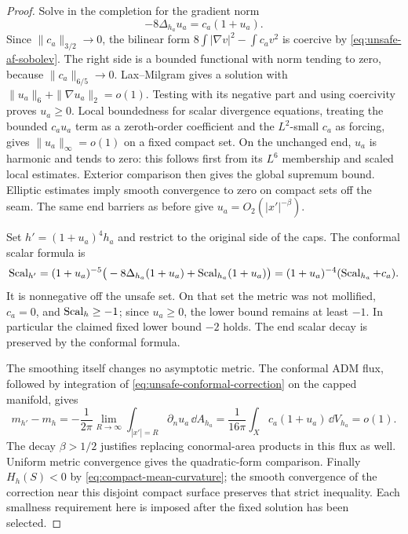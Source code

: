 \begin{proof}
Solve in the completion for the gradient norm
\begin{equation}
 -8\Delta_{h_a}u_a=c_a(1+u_a).
 \label{eq:unsafe-conformal-correction}
\end{equation}
Since \(\|c_a\|_{3/2}\to0\), the bilinear form
\(8\int|\nabla v|^2-\int c_av^2\) is coercive by
\eqref{eq:unsafe-af-sobolev}.  The right side is a bounded
functional with norm tending to zero, because
\(\|c_a\|_{6/5}\to0\).  Lax--Milgram gives a solution with
\(\|u_a\|_6+\|\nabla u_a\|_2=o(1)\).  Testing with its
negative part and using coercivity proves \(u_a\ge0\).
Local boundedness for scalar divergence equations, treating the
bounded \(c_a u_a\) term as a zeroth-order coefficient and the
\(L^2\)-small \(c_a\) as forcing, gives
\(\|u_a\|_\infty=o(1)\) on a fixed compact set.  On the
unchanged end, \(u_a\) is harmonic and tends to zero: this
follows first from its \(L^6\) membership and scaled local
estimates.  Exterior comparison then gives the global supremum
bound.  Elliptic estimates imply smooth convergence to zero on
compact sets off the seam.  The same end barriers as before give
\(u_a=O_2(|x'|^{-\beta})\).

Set \(h'=(1+u_a)^4h_a\) and restrict to the original side of
the caps.  The conformal scalar formula is
\begin{equation}
 \operatorname{Scal}_{h'}=(1+u_a)^{-5}
       \big(-8\Delta_{h_a}(1+u_a)+\operatorname{Scal}_{h_a}(1+u_a)\big)
       =(1+u_a)^{-4}(\operatorname{Scal}_{h_a}+c_a).
 \label{eq:unsafe-corrected-scalar}
\end{equation}
It is nonnegative off the unsafe set.  On that set the metric
was not mollified, \(c_a=0\), and \(\operatorname{Scal}_h\ge-1\);
since \(u_a\ge0\), the lower bound remains at least \(-1\).
In particular the claimed fixed lower bound \(-2\) holds.
The end scalar decay is preserved by the conformal formula.

The smoothing itself changes no asymptotic metric.  The conformal
ADM flux, followed by integration of
\eqref{eq:unsafe-conformal-correction} on the capped manifold,
gives
\begin{equation}
 m_{h'}-m_h
   =-\frac1{2\pi}\lim_{R\to\infty}
                   \int_{|x'|=R}\partial_nu_a\,\dd A_{h_a}
   =\frac1{16\pi}\int_X c_a(1+u_a)\,\dd V_{h_a}=o(1).
 \label{eq:unsafe-smoothing-mass}
\end{equation}
The decay \(\beta>1/2\) justifies replacing conormal-area
products in this flux as well.  Uniform metric convergence gives
the quadratic-form comparison.  Finally \(H_h(S)<0\) by
\eqref{eq:compact-mean-curvature}; the smooth convergence of the
correction near this disjoint compact surface preserves that
strict inequality.  Each smallness requirement here is imposed
after the fixed solution has been selected.
\end{proof}

